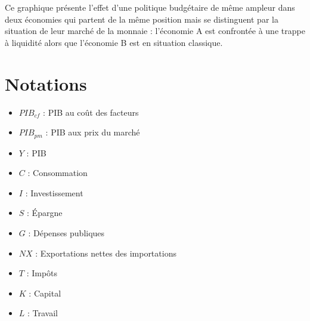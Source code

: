\documentclass[10pt]{book}
\begin{document}
Ce graphique présente l'effet d'une politique budgétaire de même ampleur dans deux économies qui partent de la même position mais se distinguent par la situation de leur marché de la monnaie : l'économie A est confrontée à une trappe à liquidité alors que l'économie B est en situation classique. \\




\appendix
\chapter{Notations} 
\begin{itemize}
  \item $PIB_{cf}$ : PIB au coût des facteurs
  \item $PIB_{pm}$ : PIB aux prix du marché
  \item $Y$ : PIB
  \item $C$ : Consommation
  \item $I$ : Investissement
  \item $S$ : Épargne
  \item $G$ : Dépenses publiques
  \item $NX$ : Exportations nettes des importations
  \item $T$ : Impôts
  \item $K$ : Capital
  \item $L$ : Travail
\end{itemize}
\end{document}
